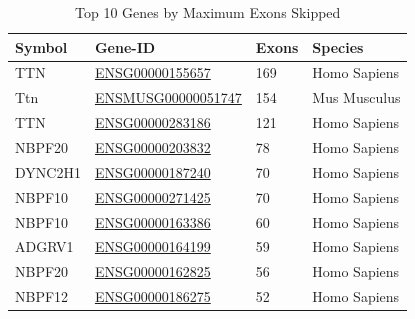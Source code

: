 \documentclass{article}
\begin{document}
    \begin{table}[H]
        \caption{Top 10 Genes by Maximum Exons Skipped}
        \label{tab:exons-skipped}
        \begin{center}
            \begin{tabular}{ |p{2cm}|p{4cm}|p{2cm}| p{2.5cm}|  }
                \hline
                Symbol  & Gene-ID                                                                                           & Exons & Species      \\
                \hline
                TTN     & \href{https://www.ensembl.org/Homo_sapiens/Gene/Summary?g=ENSG00000155657}{ENSG00000155657} & 169 & Homo Sapiens \\
                Ttn     & \href{https://www.ensembl.org/mus_musculus/Gene/Summary?g=ENSMUSG00000051747}{ENSMUSG00000051747}   & 154 & Mus Musculus \\
                TTN     & \href{https://www.ensembl.org/Homo_sapiens/Gene/Idhistory?g=ENSG00000283186}{ENSG00000283186} & 121 & Homo Sapiens \\
                NBPF20  & \href{https://www.ensembl.org/Homo_sapiens/Gene/Idhistory?g=ENSG00000203832}{ENSG00000203832} & 78 & Homo Sapiens \\
                DYNC2H1 & \href{https://www.ensembl.org/Homo_sapiens/Gene/Summary?g=ENSG00000187240}{ENSG00000187240} & 70 & Homo Sapiens \\
                NBPF10  & \href{https://www.ensembl.org/Homo_sapiens/Gene/Summary?g=ENSG00000271425}{ENSG00000271425} & 70 & Homo Sapiens   \\
                NBPF10  & \href{https://www.ensembl.org/Homo_sapiens/Gene/Idhistory?g=ENSG00000163386}{ENSG00000163386} & 60 & Homo Sapiens \\
                ADGRV1  & \href{https://www.ensembl.org/Homo_sapiens/Gene/Summary?g=ENSG00000164199}{ENSG00000164199} & 59 & Homo Sapiens \\
                NBPF20  & \href{https://www.ensembl.org/Homo_sapiens/Gene/Summary?g=ENSG00000162825}{ENSG00000162825} & 56 & Homo Sapiens \\
                NBPF12  & \href{https://www.ensembl.org/Homo_sapiens/Gene/Idhistory?g=ENSG00000186275}{ENSG00000186275} & 52 & Homo Sapiens \\
                \hline
            \end{tabular}
        \end{center}
    \end{table}
\end{document}
